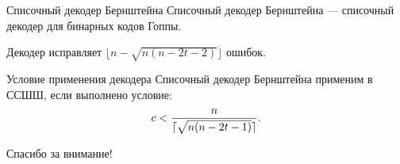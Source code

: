 \documentclass{beamer}
\begin{document}
\begin {frame} {Списочный декодер Бернштейна}
Списочный декодер Бернштейна --- списочный декодер для бинарных кодов Гоппы.
\newline

Декодер исправляет $\lfloor n - \sqrt {n(n-2t-2)} \rfloor$ ошибок.

\begin {block} {Условие применения декодера}
Списочный декодер Бернштейна применим в ССШШ, если выполнено условие:
$$ {\sl c} < \frac {\sl n}{\lceil \sqrt{n(n - 2t - 1)} \rceil}.$$
\end {block}
\end {frame}

\begin {frame}
Спасибо за внимание!
\end {frame}
\end{document}
